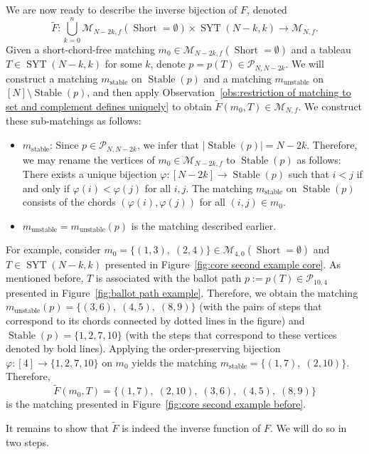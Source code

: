 \documentclass[11pt]{article}
\theoremstyle{definition}
\numberwithin{equation}{section}
\newcommand{\Syt}{\operatorname{SYT}}
\newcommand{\Short}{\operatorname{Short}}
\newcommand{\Stable}{\operatorname{Stable}}
\newcommand{\M}{\mathcal{M}}
\newcommand{\Pcal}{\mathcal{P}}
\begin{document}
We are now ready to describe the inverse bijection of $F$, denoted
\[
    \tilde{F}:\bigcup_{k=0}^n \M_{N-2k,f}(\Short = \emptyset) \times \Syt(N-k,k) \to \M_{N,f}.
\]
Given a short-chord-free matching $m_0 \in \M_{N-2k,f}(\Short = \emptyset)$ and a tableau $T \in \Syt(N-k,k)$ for some $k$, denote $p = p(T) \in \Pcal_{N,N-2k}$.
We will construct a matching $m_{\text{stable}}$ on $\Stable(p)$ and a matching $m_{\text{unstable}}$ on $[N]\setminus\Stable(p)$, and then apply Observation~\ref{obs:restriction of matching to set and complement defines uniquely} to obtain $\tilde{F}(m_0,T) \in \M_{N,f}$. We construct these sub-matchings as follows:
\begin{itemize}
    \item $m_{\text{stable}}$: Since $p \in \Pcal_{N,N-2k}$, we infer that $\left|\Stable(p)\right| = N-2k$. Therefore, we may rename the vertices of $m_0 \in \M_{N-2k,f}$ to $\Stable(p)$ as follows: There exists a unique bijection $\varphi:[N-2k] \to \Stable(p)$ such that $i < j$ if and only if $\varphi(i) <\varphi(j)$ for all $i,j$. The matching $m_{\text{stable}}$ on $\Stable(p)$ consists of the chords $(\varphi(i), \varphi(j))$ for all $(i,j) \in m_0$.
    \item $m_{\text{unstable}} = m_{\text{unstable}}(p)$ is the matching described earlier.
\end{itemize}

For example, consider $m_0 = \{(1,3),\; (2,4)\} \in \M_{4,0}(\Short = \emptyset)$ and $T \in \Syt(N-k,k)$ presented in Figure~\ref{fig:core second example core}. As mentioned before, $T$ is associated with the ballot path $p := p(T) \in \Pcal_{10,4}$ presented in Figure~\ref{fig:ballot path example}. Therefore, we obtain the matching $m_{\text{unstable}}(p) = \{(3,6),\; (4,5),\; (8,9)\}$ (with the pairs of steps that correspond to its chords connected by dotted lines in the figure) and $\Stable(p) = \{1,2,7,10\}$ (with the steps that correspond to these vertices denoted by bold lines). Applying the order-preserving bijection $\varphi:[4] \to \{1,2,7,10\}$ on $m_0$ yields the matching $m_{\text{stable}} = \{(1,7),\; (2,10)\}$. Therefore,
\[
    \tilde{F}(m_0,T) = \{(1,7),\; (2,10),\; (3,6),\; (4,5),\; (8,9)\}
\]
is the matching presented in Figure~\ref{fig:core second example before}.

It remains to show that $\tilde{F}$ is indeed the inverse function of $F$. We will do so in two steps.
\end{document}
